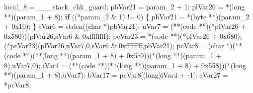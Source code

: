 \documentclass[
]{article}
\newenvironment{Shaded}{}{}
\newcommand{\BaseNTok}[1]{\textcolor[rgb]{0.25,0.63,0.44}{#1}}
\newcommand{\ControlFlowTok}[1]{\textcolor[rgb]{0.00,0.44,0.13}{\textbf{#1}}}
\newcommand{\DataTypeTok}[1]{\textcolor[rgb]{0.56,0.13,0.00}{#1}}
\newcommand{\DecValTok}[1]{\textcolor[rgb]{0.25,0.63,0.44}{#1}}
\newcommand{\NormalTok}[1]{#1}
\newcommand{\OperatorTok}[1]{\textcolor[rgb]{0.40,0.40,0.40}{#1}}
\begin{document}
\begin{Shaded}
\begin{Highlighting}[]
\NormalTok{  local\_8 }\OperatorTok{=}\NormalTok{ \_\_\_stack\_chk\_guard}\OperatorTok{;}
\NormalTok{  pbVar21 }\OperatorTok{=}\NormalTok{ param\_2 }\OperatorTok{+} \DecValTok{1}\OperatorTok{;}
\NormalTok{  plVar26 }\OperatorTok{=} \OperatorTok{*(}\DataTypeTok{long} \OperatorTok{**)(}\NormalTok{param\_1 }\OperatorTok{+} \DecValTok{8}\OperatorTok{);}
  \ControlFlowTok{if} \OperatorTok{((*}\NormalTok{param\_2 }\OperatorTok{\&} \DecValTok{1}\OperatorTok{)} \OperatorTok{!=} \DecValTok{0}\OperatorTok{)} \OperatorTok{\{}
\NormalTok{    pbVar21 }\OperatorTok{=} \OperatorTok{*(}\NormalTok{byte }\OperatorTok{**)(}\NormalTok{param\_2 }\OperatorTok{+} \BaseNTok{0x10}\OperatorTok{);}
  \OperatorTok{\}}
\NormalTok{  sVar6 }\OperatorTok{=}\NormalTok{ strlen}\OperatorTok{((}\DataTypeTok{char} \OperatorTok{*)}\NormalTok{pbVar21}\OperatorTok{);}
\NormalTok{  uVar7 }\OperatorTok{=} \OperatorTok{(**(}\NormalTok{code }\OperatorTok{**)(*}\NormalTok{plVar26 }\OperatorTok{+} \BaseNTok{0x580}\OperatorTok{))(}\NormalTok{plVar26}\OperatorTok{,}\NormalTok{sVar6 }\OperatorTok{\&} \BaseNTok{0xffffffff}\OperatorTok{);}
\NormalTok{  pcVar23 }\OperatorTok{=} \OperatorTok{*(}\NormalTok{code }\OperatorTok{**)(*}\NormalTok{plVar26 }\OperatorTok{+} \BaseNTok{0x680}\OperatorTok{);}
  \OperatorTok{(*}\NormalTok{pcVar23}\OperatorTok{)(}\NormalTok{plVar26}\OperatorTok{,}\NormalTok{uVar7}\OperatorTok{,}\DecValTok{0}\OperatorTok{,}\NormalTok{sVar6 }\OperatorTok{\&} \BaseNTok{0xffffffff}\OperatorTok{,}\NormalTok{pbVar21}\OperatorTok{);}
\NormalTok{  pcVar8 }\OperatorTok{=} \OperatorTok{(}\DataTypeTok{char} \OperatorTok{*)(**(}\NormalTok{code }\OperatorTok{**)(**(}\DataTypeTok{long} \OperatorTok{**)(}\NormalTok{param\_1 }\OperatorTok{+} \DecValTok{8}\OperatorTok{)} \OperatorTok{+} \BaseNTok{0x5c0}\OperatorTok{))(*(}\DataTypeTok{long} \OperatorTok{**)(}\NormalTok{param\_1 }\OperatorTok{+} \DecValTok{8}\OperatorTok{),}\NormalTok{uVar7}\OperatorTok{,}\DecValTok{0}\OperatorTok{);}
\NormalTok{  iVar4 }\OperatorTok{=} \OperatorTok{(**(}\NormalTok{code }\OperatorTok{**)(**(}\DataTypeTok{long} \OperatorTok{**)(}\NormalTok{param\_1 }\OperatorTok{+} \DecValTok{8}\OperatorTok{)} \OperatorTok{+} \BaseNTok{0x558}\OperatorTok{))(*(}\DataTypeTok{long} \OperatorTok{**)(}\NormalTok{param\_1 }\OperatorTok{+} \DecValTok{8}\OperatorTok{),}\NormalTok{uVar7}\OperatorTok{);}
\NormalTok{  bVar17 }\OperatorTok{=}\NormalTok{ pcVar8}\OperatorTok{[(}\DataTypeTok{long}\OperatorTok{)}\NormalTok{iVar4 }\OperatorTok{+} \OperatorTok{{-}}\DecValTok{1}\OperatorTok{];}
\NormalTok{  cVar27 }\OperatorTok{=} \OperatorTok{*}\NormalTok{pcVar8}\OperatorTok{;}

\end{Highlighting}
\end{Shaded}
\end{document}
